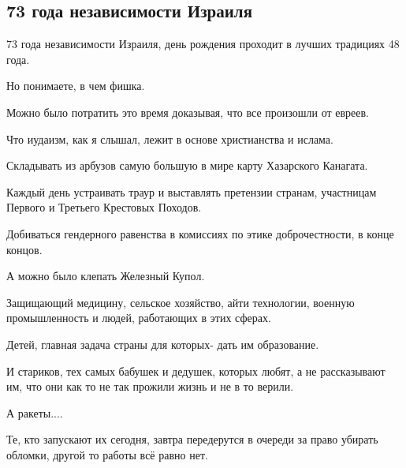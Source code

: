  
 
 
 
 
\subsection{73 года независимости Израиля}
\label{sec:14_05_2021.fb.buzhanskii_maksim.1.izrail}

73 года независимости Израиля, день рождения проходит в лучших традициях 48 года.

Но понимаете, в чем фишка.

Можно было потратить это время доказывая, что все произошли от евреев.

Что иудаизм, как я слышал, лежит в основе христианства и ислама.

Складывать из арбузов самую большую в мире карту Хазарского Канагата.

Каждый день устраивать траур и выставлять претензии странам, участницам Первого и Третьего Крестовых Походов.

Добиваться гендерного равенства в комиссиях по этике доброчестности, в конце концов.

А можно было клепать Железный Купол.

Защищающий медицину, сельское хозяйство, айти технологии, военную промышленность и людей, работающих в этих сферах.

Детей, главная задача страны для которых- дать им образование.

И стариков, тех самых бабушек и дедушек, которых любят, а не рассказывают им, что они как то не так прожили жизнь и не в то верили.

А ракеты....

Те, кто запускают их сегодня, завтра передерутся в очереди за право убирать обломки, другой то работы всё равно нет.
